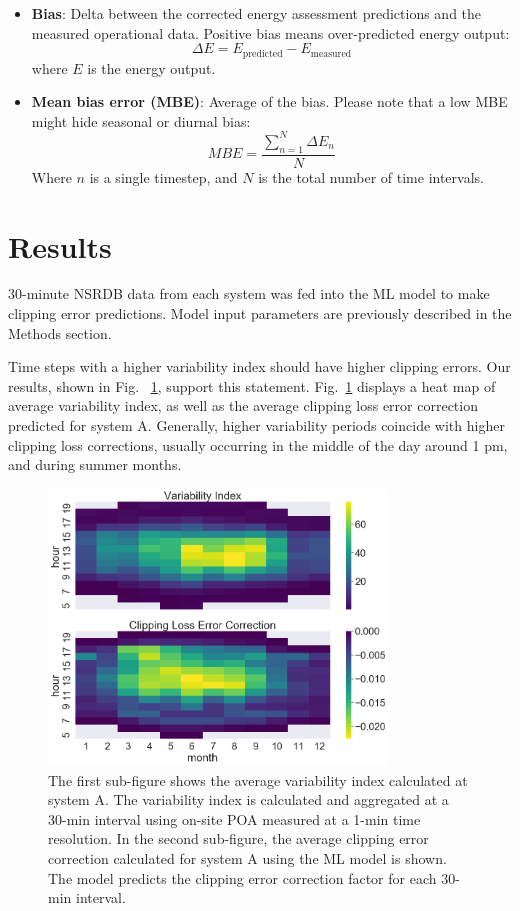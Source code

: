 \documentclass[conference]{IEEEtran}
\begin{document}
\begin{itemize}
\item \textbf{Bias}: Delta between the corrected energy assessment predictions and the measured operational data. Positive bias means over-predicted energy output:
\begin{equation}
\Delta E={E_\text{predicted}} - {E_\text{measured}}\label{eq:bias}
\end{equation}
where $E$ is the energy output.
\item \textbf{Mean bias error (MBE)}: Average of the bias. Please note that a low MBE might hide seasonal or diurnal bias:
\begin{equation}
\mathit{MBE}=\frac{\sum_{n=1}^N{\Delta E_n}}{N}\label{eq:mbe}
\end{equation}
Where $n$ is a single timestep, and $N$ is the total number of time intervals.
\end{itemize}


\section{Results}

30-minute NSRDB data from each system was fed into the ML model to make clipping error predictions. Model input parameters are previously described in the Methods section.

Time steps with a higher variability index should have higher clipping errors. Our results, shown in Fig. ~\ref{fig:DCS-vi-clec-heatmap}, support this statement. Fig.~\ref{fig:DCS-vi-clec-heatmap} displays a heat map of average variability index, as well as the average clipping loss error correction predicted for system A. Generally, higher variability periods coincide with higher clipping loss corrections, usually occurring in the middle of the day around 1 pm, and during summer months.

\begin{figure}[htbp]
\centerline{\includegraphics[width=9cm]{DCS_VI_CLEC_heatmap.png}}
\caption{The first sub-figure shows the average variability index calculated at system A. The variability index is calculated and aggregated at a 30-min interval using on-site POA measured at a 1-min time resolution. In the second sub-figure, the average clipping error correction calculated for system A using the ML model is shown. The model predicts the clipping error correction factor for each 30-min interval.}
\label{fig:DCS-vi-clec-heatmap}
\end{figure}
\end{document}
